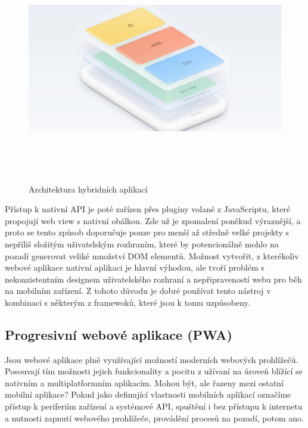 \documentclass[
  glossaries,
]{kidiplom}
\begin{document}
\begin{figure}[H]
  	\centering
 	 \includegraphics[width=12cm,height=10cm,keepaspectratio]{hybridni_aplikace}
 	 \caption{\cite{5} Architektura hybridních aplikací}
 	 \label{fig:HybridArchitecture}
\end{figure}


Přístup k nativní API je poté zařízen přes pluginy volané z JavaScriptu, které propojují web view s nativní obálkou. Zde už je zpomalení poněkud výraznější, a proto se tento způsob doporučuje pouze pro menší až středně velké projekty s nepříliš složitým uživatelským rozhraním, které by potencionálně mohlo na pozadí generovat veliké množství DOM elementů. Možnost vytvořit, z kterékoliv webové aplikace nativní aplikaci je hlavní výhodou, ale tvoří problém s nekonzistentním designem uživatelského rozhraní a nepřipraveností webu pro běh na mobilním zařízení. Z tohoto důvodu je dobré používat tento nástroj v kombinaci s některým z framewoků, které jsou k tomu uzpůsobeny.

\subsection{Progresivní webové aplikace (PWA)}
Jsou webové aplikace plně využívající možností moderních webových prohlížečů. Posouvají tím možnosti jejich funkcionality a pocitu z užívaní na úroveň blížící se nativním a multiplatformním aplikacím. Mohou být, ale řazeny mezi ostatní mobilní aplikace? Pokud jako definující vlastnosti mobilních aplikací označíme přístup k periferiím zařízení a systémové API, spuštění i bez přístupu k internetu a nutnosti zapnutí webového prohlížeče, provádění procesů na pozadí, potom ano.
\end{document}
